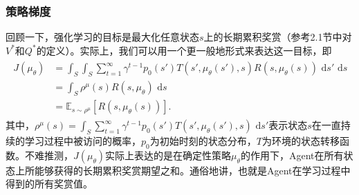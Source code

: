 \subsubsection{策略梯度}
回顾一下，强化学习的目标是最大化任意状态$s$上的长期累积奖赏（参考2.1节中对$V^*$和$Q^*$的定义）。实际上，我们可以用一个更一般地形式来表达这一目标，即
\begin{align}
   \begin{split} J(\mu_{\theta}) &= \int_S \int_S \sum_{t=1}^{\infty} \gamma^{t-1} p_0(s') T(s', \mu_{\theta}(s'), s) R(s, \mu_{\theta}(s)) \text{ d}s' \text{ d}s \\ &= \int_S \rho^{\mu}(s) R(s, \mu_{\theta}) \text{ d}s  \\ &= \mathbb{E}_{s \sim \rho^{\mu}} [R(s, \mu_{\theta}(s) )]. \end{split} 
\end{align}
 其中，$\rho^{\mu}(s) = \int_S \sum_{t=1}^{\infty} \gamma^{t-1} p_0(s') T(s', \mu_{\theta}(s'), s)  \text{ d}s'$表示状态$s$在一直持续的学习过程中被访问的概率，$p_0$为初始时刻的状态分布，$T$为环境的状态转移函数。不难推测，$J({\mu_{\theta}})$实际上表达的是在确定性策略$\mu_{\theta}$的作用下，Agent在所有状态上所能够获得的长期累积奖赏期望之和。通俗地讲，也就是Agent在学习过程中得到的所有奖赏值。

